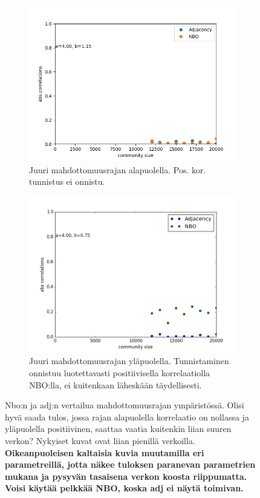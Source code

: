 \documentclass[finnish,12pt,a4paper,pdftex,sci,utf8]{aaltothesis}
\begin{document}
\begin{figure}
	\centering
	\begin{subfigure}[b]{0.45 \textwidth}
		\includegraphics[width = \textwidth]{impossible.png}
		\caption{Juuri mahdottomuusrajan alapuolella. Pos. kor. tunnistus ei onnistu.}
	\end{subfigure}
	\begin{subfigure}[b]{0.45 \textwidth}
		\includegraphics[width = \textwidth]{possible.png}
		\caption{Juuri mahdottomuusrajan yläpuolella. Tunnistaminen onnistuu luotettavasti positiivisella korrelaatiolla NBO:lla, ei kuitenkaan läheskään täydellisesti.}
	\end{subfigure}
	\caption{Nbo:n ja adj:n vertailua mahdottomuusrajan ympäristössä. Olisi hyvä saada tulos, jossa rajan alapuolella korrelaatio on nollassa ja yläpuolella positiivinen, saattaa vaatia kuitenkin liian suuren verkon? Nykyiset kuvat ovat liian pienillä verkoilla. \textbf{Oikeanpuoleisen kaltaisia kuvia muutamilla eri parametreillä, jotta näkee tuloksen paranevan parametrien mukana ja pysyvän tasaisena verkon koosta riippumatta. Voisi käytää pelkkää NBO, koska adj ei näytä toimivan. }}
	\label{fig:rajatapaus}
\end{figure}
\end{document}
